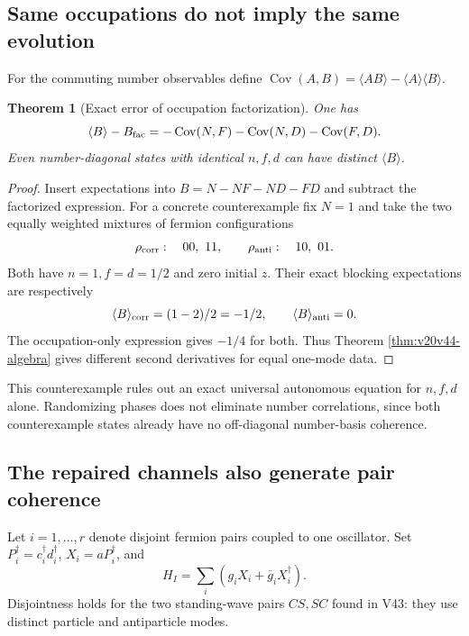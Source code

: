 \documentclass[11pt]{article}
\newtheorem{theorem}{Theorem}[section]
\theoremstyle{remark}
\begin{document}
\subsection{Same occupations do not imply the same evolution}

For the commuting number observables define
\(\operatorname{Cov}(A,B)=\langle AB\rangle-\langle A\rangle
\langle B\rangle\).

\begin{theorem}[Exact error of occupation factorization]
\label{thm:v20v44-correlations}
One has
\[
 \langle B\rangle-B_{\rm fac}
 =-\operatorname{Cov}(N,F)-\operatorname{Cov}(N,D)
  -\operatorname{Cov}(F,D).
\]
Even number-diagonal states with identical \(n,f,d\) can have distinct
\(\langle B\rangle\).
\end{theorem}
\begin{proof}
Insert expectations into \(B=N-NF-ND-FD\) and subtract the
factorized expression.  For a concrete counterexample fix \(N=1\)
and take the two equally weighted mixtures of fermion configurations
\[
 \rho_{\rm corr}:\quad 00,\ 11,\qquad
 \rho_{\rm anti}:\quad 10,\ 01.
\]
Both have \(n=1,f=d=1/2\) and zero initial \(z\).  Their exact
blocking expectations are respectively
\[
 \langle B\rangle_{\rm corr}=(1-2)/2=-1/2,\qquad
 \langle B\rangle_{\rm anti}=0.
\]
The occupation-only expression gives \(-1/4\) for both.
Thus Theorem \ref{thm:v20v44-algebra} gives different second
derivatives for equal one-mode data.
\end{proof}

This counterexample rules out an exact universal autonomous equation
for \(n,f,d\) alone.  Randomizing phases does not eliminate number
correlations, since both counterexample states already have no
off-diagonal number-basis coherence.

\subsection{The repaired channels also generate pair coherence}

Let \(i=1,\ldots,r\) denote disjoint fermion pairs coupled to one
oscillator.  Set \(P_i^\dagger=c_i^\dagger d_i^\dagger\),
\(X_i=aP_i^\dagger\), and
\[
 H_I=\sum_i(g_iX_i+\overline g_iX_i^\dagger).
\]
Disjointness holds for the two standing-wave pairs \(CS,SC\) found
in V43: they use distinct particle and antiparticle modes.
\end{document}
